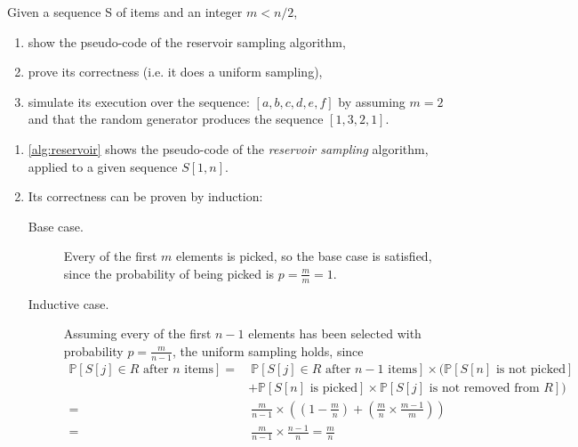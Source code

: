 \exercise

Given a sequence S of items and an integer $m < n/2$,
%
\begin{enumerate}
  \item show the pseudo-code of the reservoir sampling algorithm,
  \item prove its correctness (i.e. it does a uniform sampling),
  \item simulate its execution over the sequence: $[a, b, c, d, e, f]$ by
  assuming $m=2$ and that the random generator produces the sequence $[1, 3, 2,
  1]$.
\end{enumerate}

\solution

\begin{enumerate}

  \item \autoref{alg:reservoir} shows the pseudo-code of the
  \emph{reservoir sampling} algorithm, applied to a given sequence $S[1, n]$.

  \item Its correctness can be proven by induction:
  \begin{description}

    \item[Base case.] Every of the first $m$ elements is picked, so the base
    case is satisfied, since the probability of being picked is $p =
    \frac{m}{m} = 1$.

    \item[Inductive case.] Assuming every of the first $n - 1$ elements has been
    selected with probability $p = \frac{m}{n - 1}$, the uniform sampling
    holds, since
    \begin{align*}
      \mathbb{P}\left[ S[j] \in R \text{ after } n \text{ items} \right] =&\
      \mathbb{P}\left[ S[j] \in R \text{ after } n - 1 \text{ items} \right]
      \times \Big( \mathbb{P}\left[ S[n] \text{ is not picked} \right] \\
      & + \mathbb{P}\left[ S[n] \text{ is picked} \right] \times
      \mathbb{P}\left[ S[j] \text{ is not removed from } R \right] \Big)\\
      =&\ \frac{m}{n - 1} \times \left( \left(1 - \frac{m}{n} \right) +
      \left(\frac{m}{n} \times \frac{m - 1}{m} \right)\right) \\
      =&\ \frac{m}{n - 1} \times \frac{n - 1}{n} = \frac{m}{n}
    \end{align*}

  \end{description}


\end{enumerate}
